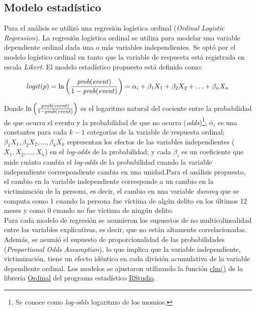 \documentclass[letterpaper]{article}
\begin{document}
\subsection{Modelo estadístico} 

Para el análisis se utilizó una regresión logística ordinal (\emph{Ordinal Logistic Regression}). La regresión logística ordinal se utiliza para modelar una variable dependiente ordinal dada una o más variables independientes. Se optó por el modelo logístico ordinal en tanto que la variable de respuesta está registrada en escala \emph{Likert}. El modelo estadístico propuesto está definido como:

\[
logit(p) = \ln\left(\frac{\text{\emph{prob}(\emph{event})}}{1 - \text{\emph{prob}(\emph{event})}}\right) = \alpha_i + \beta_1 X_1 + \beta_2 X_2 + \ldots + \beta_n X_n
\]

Donde $\ln\left(\frac{\text{\emph{prob}(\emph{event})}}{1 - \text{\emph{prob}(\emph{event})}}\right)$ es el logaritmo natural del cociente entre la probabilidad de que ocurra el evento y la probabilidad de que no ocurra (\emph{odds})\footnote{Se conoce como \emph{log-odds} logaritmo de los momios.}; $\alpha_i$ es una constantes para cada $k - 1$ categorías de la variable de respuesta ordinal; $\beta_1 X_1, \beta_2 X_2, \ldots, \beta_k X_k$ representan los efectos de las variables independientes ($X_1, X_2, \ldots, X_n$) en el \emph{log-odds} de la probabilidad; y cada $\beta_i$ es un coeficiente que mide cuánto cambia el \emph{log-odds} de la probabilidad cuando la variable independiente correspondiente cambia en una unidad.Para el análisis propuesto, el cambio en la variable independiente corresponde a un cambio en la victimización de la persona, es decir, el cambio en una variable \emph{dummy} que se computa como 1 cuando la persona fue víctima de algún delito en los últimos 12 meses y como 0 cuando no fue víctima de ningún delito.\\[-1.5em] 

Para cada modelo de regresión se asumieron los supuestos de no multicolinealidad entre las variables explicativas, es decir, que no están altamente correlacionadas. Además, se asumió el supuesto de proporcionalidad de las probabilidades (\emph{Proportional Odds Assumption}), lo que implica que la variable independiente, victimización, tiene un efecto idéntico en cada división acumulativa de la variable dependiente ordinal. Los modelos se ajustaron utilizando la función \href{https://www.rdocumentation.org/packages/ordinal/versions/2010.03-04/topics/clm}{clm()} de la librería \href{https://cran.r-project.org/web/packages/ordinal/index.html}{Ordinal} del programa estadístico \href{https://posit.co/download/rstudio-desktop/}{RStudio}.
\end{document}
